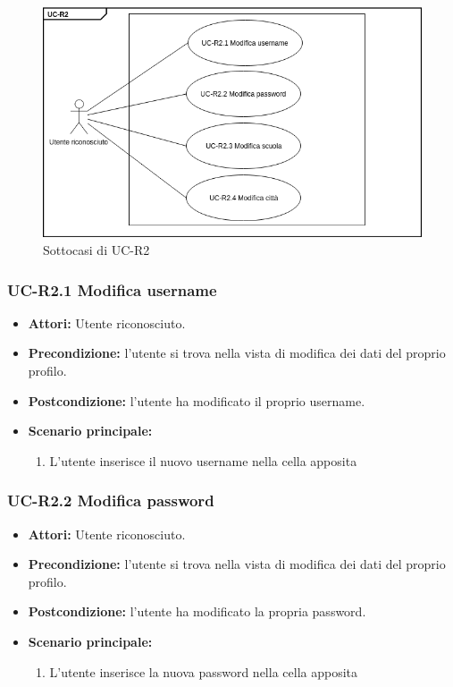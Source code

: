 				\begin{figure}[htbp]
			\centering
			\includegraphics[scale=0.7]{images/UC-R2sub.png}
			\caption{Sottocasi di UC-R2}
		\end{figure}
		
\subsubsection{UC-R2.1 Modifica username}
\begin{itemize}
			\item \textbf{Attori:} Utente riconosciuto.
			\item \textbf{Precondizione:} l'utente si trova nella vista di modifica dei dati del proprio profilo.
			\item \textbf{Postcondizione:} l'utente ha modificato il proprio username.
			\item \textbf{Scenario principale:}
			\begin{enumerate}
				\item L'utente inserisce il nuovo username nella cella apposita
			\end{enumerate}
\end{itemize}

\subsubsection{UC-R2.2 Modifica password}
\begin{itemize}
			\item \textbf{Attori:} Utente riconosciuto.
			\item \textbf{Precondizione:} l'utente si trova nella vista di modifica dei dati del proprio profilo.
			\item \textbf{Postcondizione:} l'utente ha modificato la propria password.
			\item \textbf{Scenario principale:}
			\begin{enumerate}
				\item L'utente inserisce la nuova password nella cella apposita
			\end{enumerate}
\end{itemize}

